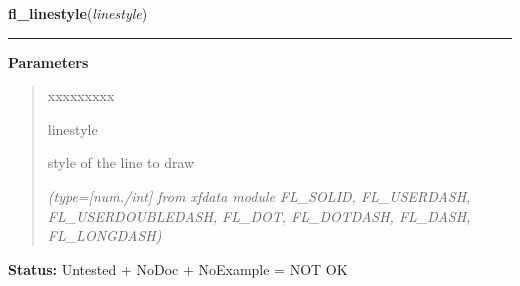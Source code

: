     \label{xformslib:library:fl_linestyle}

    \vspace{0.5ex}

\hspace{.8\funcindent}\begin{boxedminipage}{\funcwidth}

    \raggedright \textbf{fl\_linestyle}(\textit{linestyle})

    \vspace{-1.5ex}

    \rule{\textwidth}{0.5\fboxrule}
\setlength{\parskip}{2ex}
\setlength{\parskip}{1ex}
      \textbf{Parameters}
      \vspace{-1ex}

      \begin{quote}
        \begin{Ventry}{xxxxxxxxx}

          \item[linestyle]

          style of the line to draw

            {\it (type=[num./int] from xfdata module FL\_SOLID, FL\_USERDASH, FL\_USERDOUBLEDASH, 
FL\_DOT, FL\_DOTDASH, FL\_DASH, FL\_LONGDASH)}

        \end{Ventry}

      \end{quote}

\textbf{Status:} Untested + NoDoc + NoExample = NOT OK



    \end{boxedminipage}

    \label{xformslib:library:fl_linestyle}

    \vspace{0.5ex}

